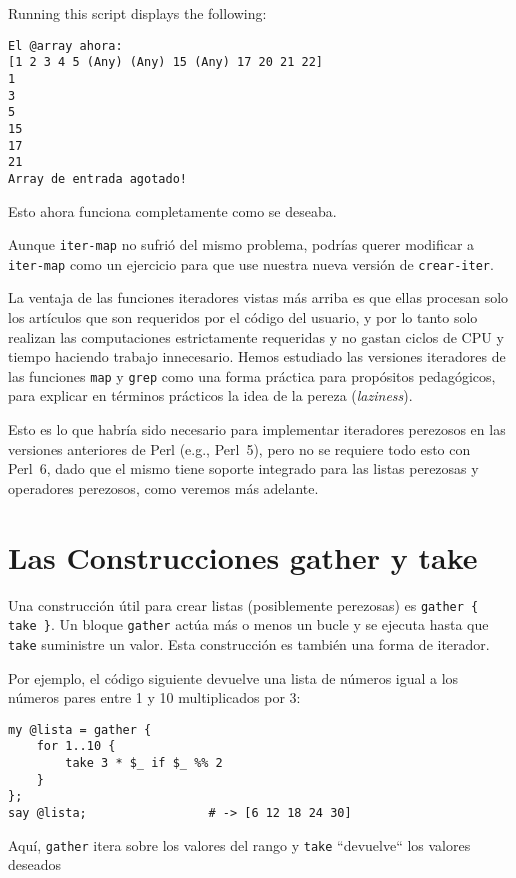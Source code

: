 Running this script displays the following:
\begin{verbatim}
El @array ahora: 
[1 2 3 4 5 (Any) (Any) 15 (Any) 17 20 21 22]
1
3
5
15
17
21
Array de entrada agotado!
\end{verbatim}

Esto ahora funciona completamente como se deseaba.

Aunque {\tt iter-map} no sufrió del mismo problema, podrías querer
modificar a {\tt iter-map} como un ejercicio para que use nuestra 
nueva versión de {\tt crear-iter}.

La ventaja de las funciones iteradores vistas más arriba es que ellas
procesan solo los artículos que son requeridos por el código del usuario,
y por lo tanto solo realizan las computaciones estrictamente requeridas y 
no gastan ciclos de CPU y tiempo haciendo trabajo innecesario. Hemos 
estudiado las versiones iteradores de las funciones {\tt map} y {\tt grep}
como una forma práctica para propósitos pedagógicos, para explicar en
términos prácticos la idea de la pereza (\emph{laziness}).

Esto es lo que habría sido necesario para implementar iteradores
perezosos en las versiones anteriores de Perl (e.g., Perl~5),
pero no se requiere todo esto con Perl~6, dado que el mismo tiene soporte 
integrado para las listas perezosas y operadores perezosos, como 
veremos más adelante.

\section{Las Construcciones gather y take}

Una construcción útil para crear listas (posiblemente perezosas)
es \verb|gather { take }|. Un bloque \verb|gather| actúa más o menos 
un bucle y se ejecuta hasta que \verb|take| suministre un valor. Esta 
construcción es también una forma de iterador.

Por ejemplo, el código siguiente devuelve una lista de números igual 
a los números pares entre 1 y 10 multiplicados por 3:

\begin{verbatim}
my @lista = gather { 
    for 1..10 {
        take 3 * $_ if $_ %% 2
    } 
};
say @lista;                 # -> [6 12 18 24 30]
\end{verbatim}

Aquí, \verb|gather| itera sobre los valores del rango y \verb|take|
``devuelve`` los valores deseados

